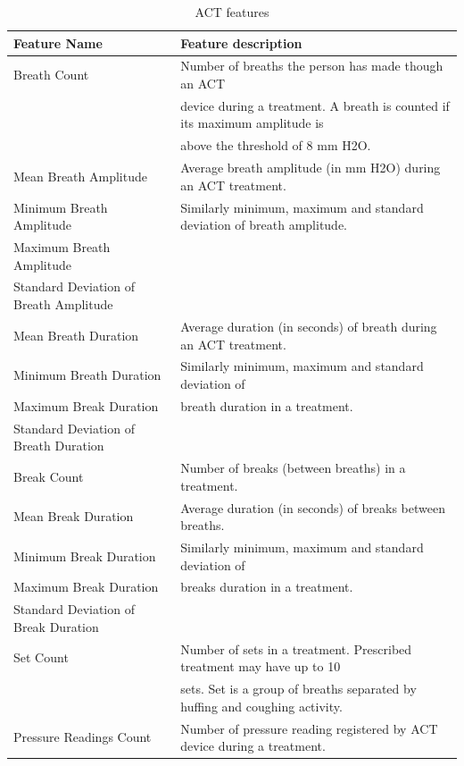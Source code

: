\documentclass{article}
\begin{document}
\begin{table}[h]
  \caption{ACT features}
  \label{act_features}
  \centering
  \begin{tabular}{ |l|l| }
    \toprule
    \cmidrule(r){1-2}
    \textbf{Feature Name} & \textbf{Feature description} \\
    \midrule
    Breath Count & Number of breaths the person has made though an ACT  \\ 
     ~ & device during a treatment. A breath is counted if its maximum amplitude is \\ ~ & above the threshold of 8 mm H2O.\\
     \midrule
     Mean Breath Amplitude & Average breath amplitude (in mm H2O) during an ACT treatment. \\
     Minimum Breath Amplitude & Similarly minimum, maximum and standard deviation of breath amplitude. \\
     Maximum Breath Amplitude & ~ \\
     Standard Deviation of Breath Amplitude & ~\\
     \midrule
     Mean Breath Duration & Average duration (in seconds) of breath during an ACT treatment.\\ 
     Minimum Breath Duration &  Similarly minimum, maximum and standard deviation of \\ 
     Maximum Break Duration & breath duration in a treatment. \\
     Standard Deviation of Breath Duration & ~\\
     \midrule
     Break Count & Number of breaks (between breaths) in a treatment. \\
     \midrule
     Mean Break Duration & Average duration (in seconds) of breaks between breaths.\\ 
     Minimum Break Duration & Similarly minimum, maximum and standard deviation of \\ 
     Maximum Break Duration & breaks duration in a treatment. \\
     Standard Deviation of Break Duration & ~\\
     \midrule
     Set Count & Number of sets in a treatment. Prescribed treatment may have up to 10 \\
     ~ & sets. Set is a group of breaths separated by huffing and coughing activity.\\
     \midrule
     Pressure Readings Count & Number of pressure reading registered by ACT device during a treatment. \\

\end{tabular}
\end{table}
\end{document}
